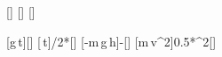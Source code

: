 [\mpss]
[\kg]
[\s]

[g\,t]{\gEX*\tstX}[\mps]
[\,t]{\vstX/2*\tstX}[\m]
[-m\,g\,h]{-\mstX*\gEX*\hstX}[\joule]
[m\,v^2]{0.5*\mstX*\vstX^2}[\joule]
